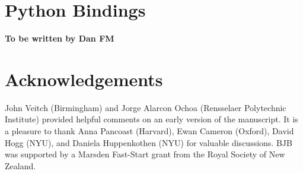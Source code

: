 \documentclass[article]{jss}
\begin{document}
\section{Python Bindings}\label{sec:python_bindings}

{\bf To be written by Dan FM}


\section*{Acknowledgements}
John Veitch (Birmingham)
and Jorge Alarcon Ochoa (Rensselaer Polytechnic Institute)
provided helpful comments on an early
version of the manuscript.
It is a pleasure to thank Anna Pancoast (Harvard),
Ewan Cameron (Oxford), David Hogg (NYU), and Daniela Huppenkothen (NYU)
for valuable discussions. BJB was supported by a Marsden Fast-Start grant
from the Royal Society of New Zealand.
\end{document}
